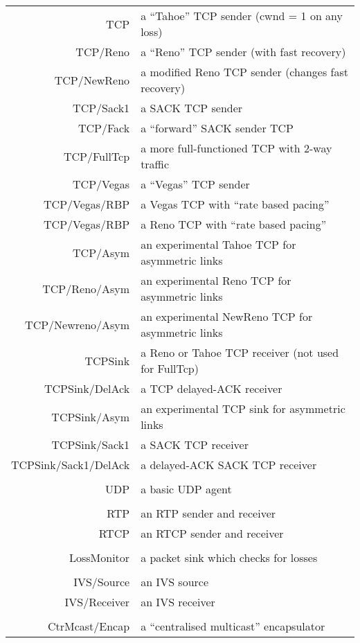 \begin{longtable}{rl}
  TCP & a ``Tahoe'' TCP sender (cwnd = 1 on any loss)   \\
  TCP/Reno & a ``Reno'' TCP sender  (with fast recovery)        \\
  TCP/NewReno & a modified Reno TCP sender (changes fast recovery)      \\
  TCP/Sack1 & a SACK TCP sender \\
  TCP/Fack & a ``forward'' SACK sender TCP      \\
  TCP/FullTcp & a more full-functioned TCP with 2-way traffic   \\
  TCP/Vegas & a ``Vegas'' TCP sender    \\
  TCP/Vegas/RBP & a Vegas TCP with ``rate based pacing''        \\
  TCP/Vegas/RBP & a Reno TCP with ``rate based pacing'' \\
  TCP/Asym & an experimental Tahoe TCP for asymmetric links     \\
  TCP/Reno/Asym & an experimental Reno TCP for asymmetric links \\
  TCP/Newreno/Asym & an experimental NewReno TCP for asymmetric links   \\
  TCPSink & a Reno or Tahoe TCP receiver (not used for FullTcp) \\
  TCPSink/DelAck & a TCP delayed-ACK receiver   \\
  TCPSink/Asym & an experimental  TCP sink for asymmetric links \\
  TCPSink/Sack1 & a SACK TCP receiver   \\
  TCPSink/Sack1/DelAck & a delayed-ACK SACK TCP receiver        \\
        \\
  UDP & a basic UDP agent\\
	\\
  RTP & an RTP sender and receiver  \\
  RTCP & an RTCP sender and receiver    \\
        \\
  LossMonitor & a packet sink which checks for losses   \\
        \\
  IVS/Source & an IVS source    \\
  IVS/Receiver & an IVS receiver        \\
        \\
  CtrMcast/Encap & a ``centralised multicast'' encapsulator     \\

\end{longtable}
